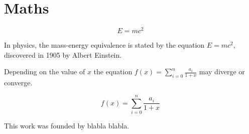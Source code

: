 \documentclass{jips}
\begin{document}
\lipsum[8]

\section{Maths}

$$E=mc^2$$

In physics, the mass-energy equivalence is stated
by the equation $E=mc^2$, discovered in 1905 by Albert Einstein.

Depending on the value of $x$ the equation \( f(x) = \sum_{i=0}^{n} \frac{a_i}{1+x} \) may diverge or converge.

\[ f(x) = \sum_{i=0}^{n} \frac{a_i}{1+x} \]

\begin{ack}
This work was founded by blabla blabla.
\end{ack}




\begin{biographies}
\end{biographies}
\end{document}
